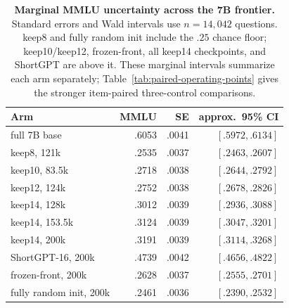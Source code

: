 \begin{table}[t]
\centering
\scriptsize
\setlength{\tabcolsep}{3pt}
\begin{tabular}{@{}lrrr@{}}
\toprule
\textbf{Arm} & \textbf{MMLU} & \textbf{SE} & \textbf{approx.\ 95\% CI} \\
\midrule
full 7B base & .6053 & .0041 & $[.5972,.6134]$ \\
keep8, 121k & .2535 & .0037 & $[.2463,.2607]$ \\
keep10, 83.5k & .2718 & .0038 & $[.2644,.2792]$ \\
keep12, 124k & .2752 & .0038 & $[.2678,.2826]$ \\
keep14, 128k & .3012 & .0039 & $[.2936,.3088]$ \\
keep14, 153.5k & .3124 & .0039 & $[.3047,.3201]$ \\
keep14, 200k & .3191 & .0039 & $[.3114,.3268]$ \\
ShortGPT-16, 200k & .4739 & .0042 & $[.4656,.4822]$ \\
frozen-front, 200k & .2628 & .0037 & $[.2555,.2701]$ \\
fully random init, 200k & .2461 & .0036 & $[.2390,.2532]$ \\
\bottomrule
\end{tabular}
\caption{\textbf{Marginal MMLU uncertainty across the 7B frontier.} Standard
errors and Wald intervals use $n=14{,}042$ questions. keep8 and
fully random init include the $.25$ chance floor; keep10/keep12,
frozen-front, all keep14 checkpoints, and ShortGPT are above it. These marginal intervals summarize each
arm separately; Table~\ref{tab:paired-operating-points} gives the stronger item-paired
three-control comparisons.}
\label{tab:app-mmlu-ci}
\end{table}
